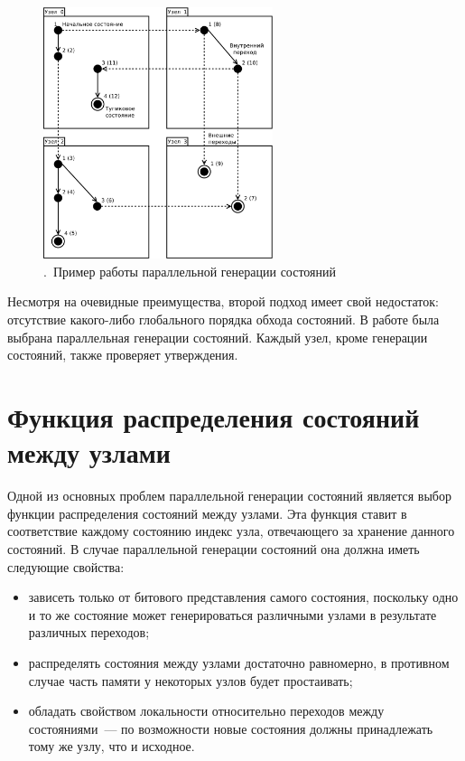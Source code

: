 \documentclass[12pt,a4paper,article]{bpm2}
\begin{document}
\begin{figure}[ht]
  \centering
  \includegraphics[width=0.6\textwidth]{graphics/distr-generation-2.pdf}
  \caption{.~Пример работы параллельной генерации состояний}
  \label{fig:distr-generation}
\end{figure}

Несмотря на очевидные преимущества, второй подход имеет свой недостаток: отсутствие какого-либо глобального порядка обхода состояний. В работе была выбрана параллельная генерации состояний. Каждый узел, кроме генерации состояний, также проверяет утверждения.

\section{Функция распределения состояний между узлами}
\label{sec:state-partition}

Одной из основных проблем параллельной генерации состояний является выбор функции распределения состояний между
узлами.
Эта функция ставит в соответствие каждому состоянию индекс узла, отвечающего за хранение данного
состояний.
В случае параллельной генерации состояний она должна иметь следующие свойства:

\begin{itemize}
\item зависеть только от битового представления самого состояния, поскольку одно и то же состояние
  может генерироваться различными узлами в результате различных переходов;

\item распределять состояния между узлами достаточно равномерно, в противном случае часть памяти у некоторых
  узлов будет простаивать;

\item обладать свойством локальности относительно переходов между состояниями~--- по возможности новые
  состояния должны принадлежать тому же узлу, что и исходное.
\end{itemize}
\end{document}
